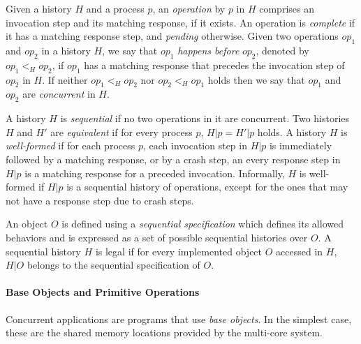 Given a history $H$ and a process $p$, an \textit{operation} by $p$ in $H$ comprises an invocation step and its matching response, if it exists. An operation is \textit{complete} if it has a matching response step, and \textit{pending} otherwise. Given two operations $op_1$ and $op_2$ in a history $H$, we say that $op_1$ \textit{happens before} $op_2$, denoted by $op_1 <_H op_2$, if $op_1$ has a matching
response that precedes the invocation step of $op_2$ in $H$. If neither $op_1 <_H op_2$ nor $op_2 <_H op_1$ holds then we say that $op_1$ and $op_2$ are \textit{concurrent} in $H$.

A history $H$ is \textit{sequential} if no two operations in it are concurrent. Two histories $H$ and $H'$ are \textit{equivalent} if for every process $p$, $H|p = H'|p$ holds. A history $H$ is \textit{well-formed} if for each process $p$, each invocation step in $H|p$ is immediately followed by a matching response, or by a crash step, an every response step in $H|p$ is a matching response for a preceded invocation. Informally, $H$ is well-formed if $H|p$ is a sequential history of operations, except for the ones that may not have a response step due to crash steps.

An object $O$ is defined using a \textit{sequential specification} which defines its allowed behaviors and is expressed as a set of possible sequential histories over $O$. A sequential history $H$ is legal if for every implemented object $O$ accessed in $H$, $H|O$ belongs to the sequential specification of $O$.



\paragraph{Base Objects and Primitive Operations}
Concurrent applications are programs that use \emph{base objects}.
In the simplest case, these are the shared memory locations provided by the multi-core system.


